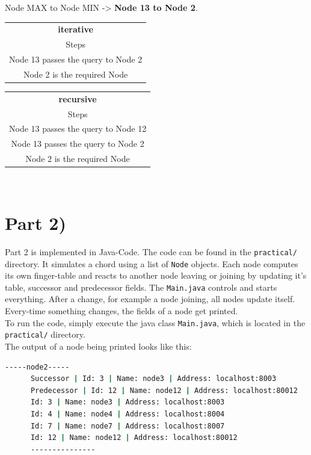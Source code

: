 \documentclass{article}
\begin{document}
      Node MAX to Node MIN -> \textbf{Node 13 to Node 2}. \\
      \newline
      \begin{tabular}{ |c| } 
      	\hline
      	\textbf{iterative} \\
      	Steps \\
      	\hline
      	Node 13 passes the query to Node 2\\
      	Node 2 is the required Node\\
      	\hline
      \end{tabular}
      \quad
      \begin{tabular}{ |c| } 
      	\hline
      	\textbf{recursive} \\
      	Steps \\
      	\hline
      	Node 13 passes the query to Node 12\\
      	Node 13 passes the query to Node 2\\
      	Node 2 is the required Node\\
      	\hline
      \end{tabular}\\  
  
  \section*{Part 2)}
  
    Part 2 is implemented in Java-Code. The code can be found in the \texttt{practical/} directory. It simulates a chord using a list of \texttt{Node} objects. Each node computes its own finger-table and reacts to another node leaving or joining by updating it's table, successor and predecessor fields. The \texttt{Main.java} controls and starts everything. After a change, for example a node joining, all nodes update itself. Every-time something changes, the fields of a node get printed.\\
    \newline
    To run the code, simply execute the java class \texttt{Main.java}, which is located in the \texttt{practical/} directory.\\
    \newline
    The output of a node being printed looks like this:\\
    \newline
    \begin{lstlisting}[language=sh]
      -----node2-----
      Successor | Id: 3 | Name: node3 | Address: localhost:8003
      Predecessor | Id: 12 | Name: node12 | Address: localhost:80012
      Id: 3 | Name: node3 | Address: localhost:8003
      Id: 4 | Name: node4 | Address: localhost:8004
      Id: 7 | Name: node7 | Address: localhost:8007
      Id: 12 | Name: node12 | Address: localhost:80012
      ---------------
    \end{lstlisting}
  
\end{document}

